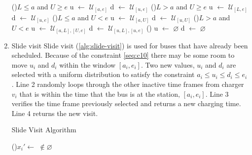 \documentclass[ee,msthesis]{usuthesis}
\newcommand{\I}{\mathbb{I}}                 %
\newcommand{\C}{\mathbb{C}}                 %
\newcommand{\U}{\mathcal{U}}                %
\newcommand{\Sol}{\mathbb{S}}               %
\begin{document}
\begin{enumerate}
\begin{algorithm}[H]
    \Begin
    {
        \If(\tcc*[f]{If $L < a < e < U]$ (\autoref{subfig:sandwich})}){$L \leq a$ and $U \geq e$}
        {
                u $\leftarrow$ $\U_{[a,e]}$\;
                d $\leftarrow$ $\U_{[u,e]}$\;
        }
        \ElseIf(){$L > a$ and $U \geq e$}
        {
                u $\leftarrow$ $\U_{[L,e]}$\;
                d $\leftarrow$ $\U_{[u,e]}$\;
        }
        \ElseIf(){$L \leq a$ and $U < e$}
        {
                u $\leftarrow$ $\U_{[a,U]}$\;
                d $\leftarrow$ $\U_{[u,U]}$\;
        }
        \ElseIf(){$L > a$ and $U < e$}
        {
                u $\leftarrow$ $\U_{[a,L], [U,e]}$\;
                d $\leftarrow$ $\U_{[u,L], [u,e]}$\;
        }
        \Else()
        {
                u $\leftarrow$ $\varnothing$\;
                d $\leftarrow$ $\varnothing$\;
        }

    }
\end{algorithm}

\item Slide visit
\label{slide-visit}
Slide visit (\ref{alg:slide-visit}) is used for buses that have already been scheduled. Because of the constraint
\ref{seq:c10} there may be some room to move \(u_i\) and \(d_i\) within the window \([a_i, e_i]\). Two new values, \(u_i\) and
\(d_i\) are selected with a uniform distribution to satisfy the constraint \(a_i \leq u_i \leq d_i \leq e_i\). Line 2 randomly loops
through the other inactive time frames from charger \(v_i\) that is within the time that the bus is at the station, \([a_i,
e_i]\). Line 3 verifies the time frame previously selected and returns a new charging time. Line 4 returns the new visit.

\begin{algorithm}[H]
\caption{Slide Visit Algorithm} \label{alg:slide-visit}
    \LinesNumbered
    \KwIn{$\Sol$}
    \KwOut{$\I_i'$}

    \Begin
    {
        \While {$C_q^j \in \{[a_i, e_i]\} \subset \U_{\C_{v_i}}$}
        {
            \If(){$x_i' \leftarrow$  $\not\in \varnothing$}
            {
                \Return{$\I_i \leftarrow x_i'$} 
            }
        }
    }
\end{algorithm}


\end{enumerate}
\end{document}
